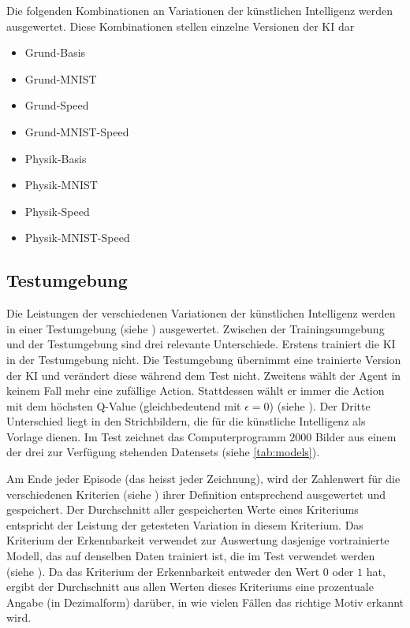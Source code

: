 Die folgenden Kombinationen an Variationen der künstlichen Intelligenz werden
ausgewertet. Diese Kombinationen stellen einzelne Versionen der KI dar
\begin{itemize}
 \item Grund-Basis
 \item Grund-MNIST
 \item Grund-Speed
 \item Grund-MNIST-Speed
 \item Physik-Basis
 \item Physik-MNIST
 \item Physik-Speed
 \item Physik-MNIST-Speed
\end{itemize}
 
\subsection{Testumgebung}\label{sub:m_auswert_test} Die Leistungen der
verschiedenen Variationen der künstlichen Intelligenz werden in einer
Testumgebung (siehe ) ausgewertet. Zwischen der
Trainingsumgebung und der Testumgebung sind drei relevante Unterschiede. Erstens
trainiert die KI in der Testumgebung nicht. Die Testumgebung übernimmt eine
trainierte Version der KI und verändert diese während dem Test nicht. Zweitens
wählt der Agent in keinem Fall mehr eine zufällige Action. Stattdessen wählt er
immer die Action mit dem höchsten Q-Value (gleichbedeutend mit $\epsilon = 0$)
(siehe ). Der Dritte Unterschied liegt in den
Strichbildern, die für die künstliche Intelligenz als Vorlage dienen. Im Test
zeichnet das Computerprogramm $2000$ Bilder aus einem der drei zur Verfügung
stehenden Datensets (siehe \autoref{tab:models}).
 
Am Ende jeder Episode (das heisst jeder Zeichnung), wird der Zahlenwert für die
verschiedenen Kriterien (siehe ) ihrer Definition
entsprechend ausgewertet und gespeichert. Der Durchschnitt aller gespeicherten
Werte eines Kriteriums entspricht der Leistung der getesteten Variation in
diesem Kriterium. Das Kriterium der Erkennbarkeit verwendet zur Auswertung
dasjenige vortrainierte Modell, das auf denselben Daten trainiert ist, die im
Test verwendet werden (siehe ). Da das Kriterium der
Erkennbarkeit entweder den Wert $0$ oder $1$ hat, ergibt der Durchschnitt aus
allen Werten dieses Kriteriums eine prozentuale Angabe (in Dezimalform) darüber,
in wie vielen Fällen das richtige Motiv erkannt wird.
